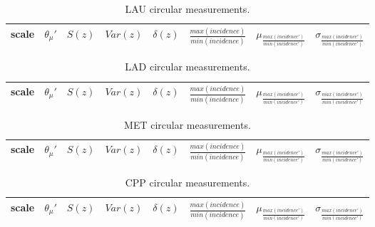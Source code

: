 \documentclass[%
 aip,
 jmp,%
 amsmath,amssymb,
 reprint,%
 floatfix,
]{revtex4-1}
\begin{document}
\begin{table}[!h]
	\caption{LAU circular measurements.}
\begin{center}
    \begin{tabular}{ |l|| c|c|c|c|c||c|c| }
        \hline
scale & $\theta_\mu'$ & $S(z)$ & $Var(z)$ & $\delta(z)$ & $\frac{max(incidence)}{min(incidence)}$ & $ \mu_{\frac{max(incidence')}{min(incidence')}} $ & $ \sigma_{\frac{max(incidence')}{min(incidence')} } $ \\ \hline\hline
	
    \end{tabular}
\end{center}
\label{tab:circLau}
\end{table}
\begin{table}[!h]
	\caption{LAD circular measurements.}
\begin{center}
    \begin{tabular}{ |l|| c|c|c|c|c||c|c| }
        \hline
scale & $\theta_\mu'$ & $S(z)$ & $Var(z)$ & $\delta(z)$ & $\frac{max(incidence)}{min(incidence)}$ & $ \mu_{\frac{max(incidence')}{min(incidence')}} $ & $ \sigma_{\frac{max(incidence')}{min(incidence')} } $ \\ \hline\hline
	
    \end{tabular}
\end{center}
\label{tab:circLad}
\end{table}
\begin{table}[!h]
	\caption{MET circular measurements.}
\begin{center}
    \begin{tabular}{ |l|| c|c|c|c|c||c|c| }
        \hline
scale & $\theta_\mu'$ & $S(z)$ & $Var(z)$ & $\delta(z)$ & $\frac{max(incidence)}{min(incidence)}$ & $ \mu_{\frac{max(incidence')}{min(incidence')}} $ & $ \sigma_{\frac{max(incidence')}{min(incidence')} } $ \\ \hline\hline
	
    \end{tabular}
\end{center}
\label{tab:circMet}
\end{table}
\begin{table}[!h]
	\caption{CPP circular measurements.}
\begin{center}
    \begin{tabular}{ |l|| c|c|c|c|c||c|c| }
        \hline
scale & $\theta_\mu'$ & $S(z)$ & $Var(z)$ & $\delta(z)$ & $\frac{max(incidence)}{min(incidence)}$ & $ \mu_{\frac{max(incidence')}{min(incidence')}} $ & $ \sigma_{\frac{max(incidence')}{min(incidence')} } $ \\ \hline\hline
	
    \end{tabular}
\end{center}
\label{tab:circCPP}
\end{table}
\end{document}
